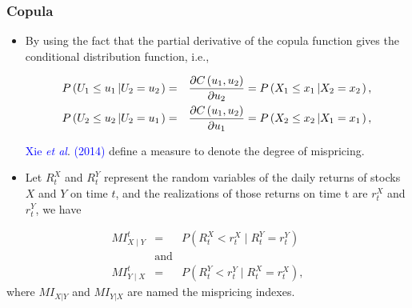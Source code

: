 \documentclass[pdf,9pt,xcolor=dvipsnames,hide notes]{beamer}
\begin{document}
\begin{frame}[label=frame4e]
	\frametitle{Copula}
	
	\begin{itemize}
			\item By using the fact that the partial derivative of the copula function gives the conditional distribution function, i.e., 
			
			\begin{eqnarray*}
				P\left( U_{1}\leq u_{1}\left\vert U_{2}=u_{2}\right. \right)  &=&\frac{%
					\partial C\left( u_{1},u_{2}\right) }{\partial u_{2}}=P\left( X_{1}\leq
				x_{1}\left\vert X_{2}=x_{2}\right. \right) , \\
				P\left( U_{2}\leq u_{2}\left\vert U_{2}=u_{1}\right. \right)  &=&\frac{%
					\partial C\left( u_{1},u_{2}\right) }{\partial u_{1}}=P\left( X_{2}\leq
				x_{2}\left\vert X_{1}=x_{1}\right. \right), 
			\end{eqnarray*}
		
		\vspace{0.3cm}
			
			 \textcolor{blue}{Xie \emph{et al}}. \textcolor{blue}{(2014)} define a measure to denote the degree of mispricing.
	
\end{itemize}

\vspace{0.3cm}
		\begin{definition}
		\begin{itemize}
			\item Let $R_{t}^{X}$ and $R_{t}^{Y}$ represent the random variables of the daily returns of stocks $X$ and $Y$ on time $t$, and
			the realizations of those returns on time t are $r_{t}^{X}$ and $r_{t}^{Y}$, we have
		\end{itemize}
		\begin{eqnarray*}
			MI_{X\mid Y}^{t} & = & P(R_{t}^{X}<r_{t}^{X}\mid R_{t}^{Y}=r_{t}^{Y}) \\
			& \text{and}  & \\
			MI_{Y\mid X}^{t} & = & P(R_{t}^{Y}<r_{t}^{Y}\mid R_{t}^{X}=r_{t}^{X}),
		\end{eqnarray*}
		where $MI_{X|Y}$ and $MI_{Y|X}$ are named the mispricing indexes.
	\end{definition}
\end{frame}
\end{document}
